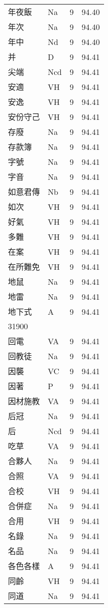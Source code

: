 \documentclass[twocolumn]{book}
\begin{document}
\begin{supertabular}{llrr}
年夜飯 & Na & 9 &  94.40\\
年次 & Na & 9 &  94.40\\
年中 & Nd & 9 &  94.40\\
并 & D & 9 &  94.41\\
尖端 & Ncd & 9 &  94.41\\
安適 & VH & 9 &  94.41\\
安逸 & VH & 9 &  94.41\\
安份守己 & VH & 9 &  94.41\\
存廢 & Na & 9 &  94.41\\
存款簿 & Na & 9 &  94.41\\
字號 & Na & 9 &  94.41\\
字音 & Na & 9 &  94.41\\
如意君傳 & Nb & 9 &  94.41\\
如次 & VH & 9 &  94.41\\
好氣 & VH & 9 &  94.41\\
多難 & VH & 9 &  94.41\\
在案 & VH & 9 &  94.41\\
在所難免 & VH & 9 &  94.41\\
地鼠 & Na & 9 &  94.41\\
地雷 & Na & 9 &  94.41\\
地下式 & A & 9 &  94.41\\
31900\\
回電 & VA & 9 &  94.41\\
回教徒 & Na & 9 &  94.41\\
因襲 & VC & 9 &  94.41\\
因著 & P & 9 &  94.41\\
因材施教 & VA & 9 &  94.41\\
后冠 & Na & 9 &  94.41\\
后 & Ncd & 9 &  94.41\\
吃草 & VA & 9 &  94.41\\
合夥人 & Na & 9 &  94.41\\
合照 & VA & 9 &  94.41\\
合校 & VH & 9 &  94.41\\
合併症 & Na & 9 &  94.41\\
合用 & VH & 9 &  94.41\\
名錄 & Na & 9 &  94.41\\
名品 & Na & 9 &  94.41\\
各色各樣 & A & 9 &  94.41\\
同齡 & VH & 9 &  94.41\\
同道 & Na & 9 &  94.41\\

\end{supertabular}
\end{document}
